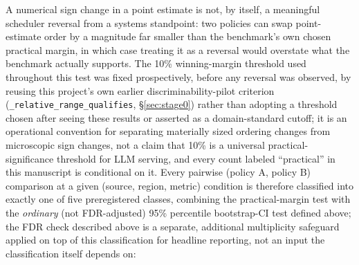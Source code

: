 A numerical sign change in a point estimate is not, by itself, a meaningful
scheduler reversal from a systems standpoint: two policies can swap
point-estimate order by a magnitude far smaller than the benchmark's own
chosen practical margin, in which case treating it as a reversal would overstate
what the benchmark actually supports. The 10\% winning-margin threshold
used throughout this test was fixed prospectively, before any
reversal was observed, by reusing this project's own earlier
discriminability-pilot criterion (\texttt{\_relative\_range\_qualifies},
\S\ref{sec:stage0}) rather than adopting a threshold chosen after seeing
these results or asserted as a domain-standard cutoff; it is an
operational convention for separating materially sized ordering changes
from microscopic sign changes, not a claim that 10\% is a universal
practical-significance threshold for LLM serving, and every count labeled
``practical'' in this manuscript is conditional on it. Every pairwise (policy A, policy B)
comparison at a given (source, region, metric) condition is therefore
classified into exactly one of five preregistered classes, combining the
practical-margin test with the \emph{ordinary} (not FDR-adjusted) 95\%
percentile bootstrap-CI test defined above; the
FDR check described above is a separate, additional multiplicity
safeguard applied on top of this classification for headline reporting,
not an input the classification itself depends on:

